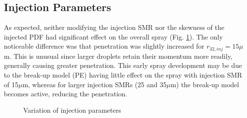 \documentclass[a4paper,10pt]{article}
\begin{document}
\subsection{Injection Parameters} %
As expected, neither modifying the injection SMR nor the skewness of the injected PDF had significant effect on the overall spray (Fig. \ref{fig:inj_cond}). The only noticeable difference was that penetration was slightly increased for $r_{32,inj}=15\mu$m. This is unusual since larger droplets retain their momentum more readily, generally causing greater penetration. This early spray development may be due to the break-up model (PE) having little effect on the spray with injection SMR of 15$\mu$m, whereas for larger injection SMRs (25 and 35$\mu$m) the break-up model becomes active, reducing the penetration.
\begin{figure}[H]
\centering
{}
\caption{Variation of injection parameters}
\label{fig:inj_cond}
\end{figure}
\end{document}

